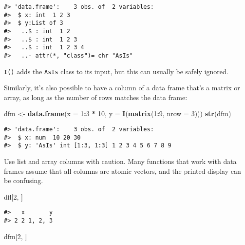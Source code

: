 \documentclass[]{book}
\newenvironment{Shaded}{\begin{snugshade}}{\end{snugshade}}
\newcommand{\KeywordTok}[1]{\textcolor[rgb]{0.13,0.29,0.53}{\textbf{#1}}}
\newcommand{\DataTypeTok}[1]{\textcolor[rgb]{0.13,0.29,0.53}{#1}}
\newcommand{\DecValTok}[1]{\textcolor[rgb]{0.00,0.00,0.81}{#1}}
\newcommand{\StringTok}[1]{\textcolor[rgb]{0.31,0.60,0.02}{#1}}
\newcommand{\OperatorTok}[1]{\textcolor[rgb]{0.81,0.36,0.00}{\textbf{#1}}}
\newcommand{\NormalTok}[1]{#1}
\theoremstyle{definition}
\theoremstyle{definition}
\theoremstyle{definition}
\theoremstyle{remark}
\begin{document}
\begin{verbatim}
#> 'data.frame':    3 obs. of  2 variables:
#>  $ x: int  1 2 3
#>  $ y:List of 3
#>   ..$ : int  1 2
#>   ..$ : int  1 2 3
#>   ..$ : int  1 2 3 4
#>   ..- attr(*, "class")= chr "AsIs"
\end{verbatim}

\texttt{I()} adds the \texttt{AsIs} class to its input, but this can
usually be safely ignored.

Similarly, it's also possible to have a column of a data frame that's a
matrix or array, as long as the number of rows matches the data frame:

\begin{Shaded}
\begin{Highlighting}[]
\NormalTok{dfm <-}\StringTok{ }\KeywordTok{data.frame}\NormalTok{(}\DataTypeTok{x =} \DecValTok{1}\OperatorTok{:}\DecValTok{3} \OperatorTok{*}\StringTok{ }\DecValTok{10}\NormalTok{, }\DataTypeTok{y =} \KeywordTok{I}\NormalTok{(}\KeywordTok{matrix}\NormalTok{(}\DecValTok{1}\OperatorTok{:}\DecValTok{9}\NormalTok{, }\DataTypeTok{nrow =} \DecValTok{3}\NormalTok{)))}
\KeywordTok{str}\NormalTok{(dfm)}
\end{Highlighting}
\end{Shaded}

\begin{verbatim}
#> 'data.frame':    3 obs. of  2 variables:
#>  $ x: num  10 20 30
#>  $ y: 'AsIs' int [1:3, 1:3] 1 2 3 4 5 6 7 8 9
\end{verbatim}

Use list and array columns with caution. Many functions that work with
data frames assume that all columns are atomic vectors, and the printed
display can be confusing.

\begin{Shaded}
\begin{Highlighting}[]
\NormalTok{dfl[}\DecValTok{2}\NormalTok{, ]}
\end{Highlighting}
\end{Shaded}

\begin{verbatim}
#>   x       y
#> 2 2 1, 2, 3
\end{verbatim}

\begin{Shaded}
\begin{Highlighting}[]
\NormalTok{dfm[}\DecValTok{2}\NormalTok{, ]}
\end{Highlighting}
\end{Shaded}
\end{document}
